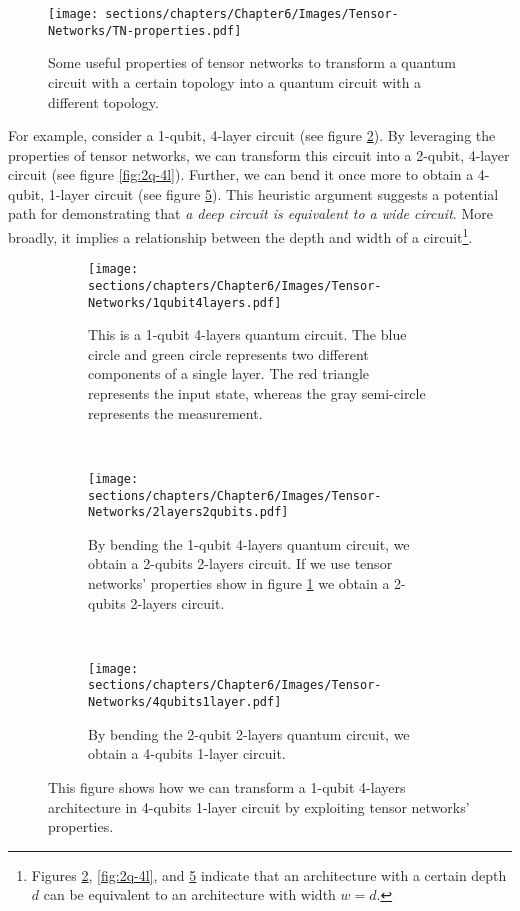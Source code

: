 \begin{itemize}
    \begin{figure}[h]
        \centering
        \texttt{[image: sections/chapters/Chapter6/Images/Tensor-Networks/TN-properties.pdf]}
        \caption{Some useful properties of tensor networks to transform a quantum circuit with a certain 
        topology into a quantum circuit with a different topology.}
        \label{fig:tensor-prop}
    \end{figure}

    For example, consider a 1-qubit, 4-layer circuit (see figure \ref{fig:1q-4l}). By leveraging 
    the properties of tensor networks, we can transform this circuit into a 2-qubit, 4-layer circuit 
    (see figure \ref{fig:2q-4l}). Further, we can bend it once more to obtain a 4-qubit, 
    1-layer circuit (see figure \ref{fig:4q-1l}). This heuristic argument suggests a potential path 
    for demonstrating that \textit{a deep circuit is equivalent to a wide circuit}. 
    More broadly, it implies a relationship between the depth and width of a 
    circuit\footnote[1]{Figures \ref{fig:1q-4l}, \ref{fig:2q-4l}, and \ref{fig:4q-1l} indicate 
    that an architecture with a certain depth $d$ can be equivalent to an architecture with width 
    $w = d$.}.\\

    \begin{figure}[h]
        \centering
        \begin{subfigure}[b]{\textwidth}
            \texttt{[image: sections/chapters/Chapter6/Images/Tensor-Networks/1qubit4layers.pdf]}
        \caption{This is a 1-qubit 4-layers quantum circuit. The blue circle and green circle represents two
        different components of a single layer. The red triangle represents the input state, whereas the 
        gray semi-circle represents the measurement.}
        \label{fig:1q-4l}
        \end{subfigure}
        \\[3ex]
        \begin{subfigure}[b]{\textwidth}
        \centering
            \texttt{[image: sections/chapters/Chapter6/Images/Tensor-Networks/2layers2qubits.pdf]}
        \caption{By bending the 1-qubit 4-layers quantum circuit, we obtain a 2-qubits 2-layers circuit. If 
        we use tensor networks' properties show in figure \ref{fig:tensor-prop} we obtain a 2-qubits 
        2-layers circuit.}
        \label{fig:2q-2l}
        \end{subfigure}
        \\[3ex]
        \begin{subfigure}[b]{\textwidth}
        \centering
            \texttt{[image: sections/chapters/Chapter6/Images/Tensor-Networks/4qubits1layer.pdf]}
        \caption{By bending the 2-qubit 2-layers quantum circuit, we obtain a 4-qubits 1-layer circuit.}
        \label{fig:4q-1l}
        \end{subfigure}
        \caption{This figure shows how we can transform a 1-qubit 4-layers architecture in 4-qubits 1-layer 
        circuit by exploiting tensor networks' properties.}
    \end{figure}


\end{itemize}
